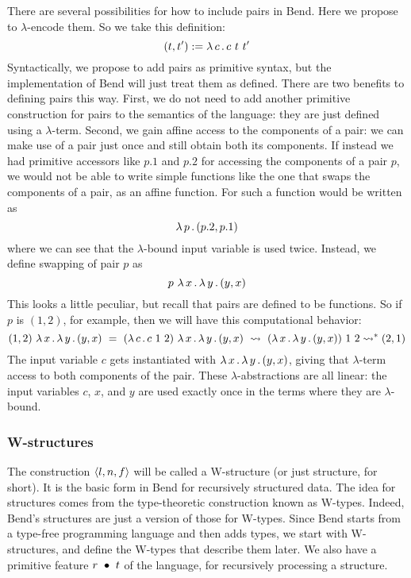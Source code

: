 \documentclass{article}
\begin{document}
There are several possibilities for how to include pairs in Bend.
Here we propose to $\lambda$-encode them.  So we take this definition:
\[
(t,t') := \lambda\, c\, .\, c\ t\ t'
\]
\noindent Syntactically, we propose to add pairs as primitive syntax,
but the implementation of Bend will just treat them as defined.  There
are two benefits to defining pairs this way.  First, we do not need to
add another primitive construction for pairs to the semantics of the
language: they are just defined using a $\lambda$-term.  Second, we
gain affine access to the components of a pair: we can make use of a
pair just once and still obtain both its components.  If instead we
had primitive accessors like $p.1$ and $p.2$ for accessing the
components of a pair $p$, we would not be able to write simple
functions like the one that swaps the components of a pair, as an
affine function.  For such a function would be written as
\[
\lambda\, p\, .\, (p.2,p.1)
\]
\noindent where we can see that the $\lambda$-bound input variable is used twice.
Instead, we define swapping of pair $p$ as
\[
p\ \lambda\, x\, .\, \lambda\, y\, .\, (y,x)
\]
\noindent This looks a little peculiar, but recall that pairs are defined to be functions.
So if $p$ is $(1,2)$, for example, then we will have this computational behavior:
\[
(1,2)\ \lam{x}{\lam{y}{(y,x)}} \ =\ (\lam{c}{c\ 1\ 2})\ \lam{x}{\lam{y}{(y,x)}}\ \leadsto\ (\lam{x}{\lam{y}{(y,x)}})\ 1\ 2 \leadsto^* (2,1)
\]
\noindent The input variable $c$ gets instantiated with
$\lambda\, x\, .\, \lambda\, y\, .\, (y,x)$, giving that $\lambda$-term access to both
components of the pair.  These $\lambda$-abstractions are all linear:
the input variables $c$, $x$, and $y$ are used exactly once in the
terms where they are $\lambda$-bound.

\subsubsection{W-structures}
\label{sec:wstruct}

The construction $\langle l , n, f \rangle$ will be called a W-structure (or just structure, for short).
It is the basic form in Bend for recursively structured data.  The idea for structures
comes from the type-theoretic construction known as W-types.  Indeed, Bend's structures
are just a version of those for W-types.  Since Bend starts from a type-free programming
language and then adds types, we start with W-structures, and define the W-types that
describe them later.  We also have a primitive feature $r\ \bullet\ t$ of the language,
for recursively processing a structure.
\end{document}

